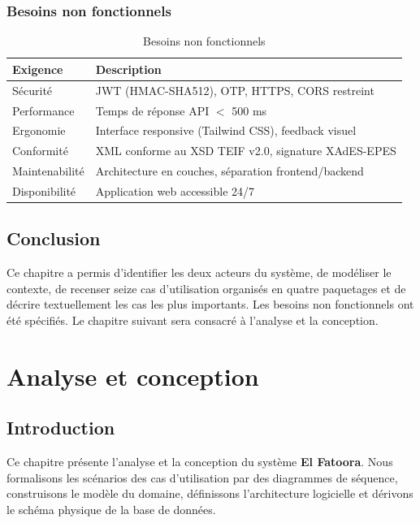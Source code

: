 \documentclass[a4paper,12pt]{report}
\newcommand{\elfattoora}{\textbf{El Fatoora}}
\begin{document}
\subsection*{Besoins non fonctionnels}

\begin{table}[htbp]
\centering
\caption{Besoins non fonctionnels}
\label{tab:bnf}
\begin{tabularx}{\textwidth}{|l|X|}
\hline
\textbf{Exigence} & \textbf{Description} \\
\hline
Sécurité & JWT (HMAC-SHA512), OTP, HTTPS, CORS restreint \\
\hline
Performance & Temps de réponse API $<$ 500 ms \\
\hline
Ergonomie & Interface responsive (Tailwind CSS), feedback visuel \\
\hline
Conformité & XML conforme au XSD TEIF v2.0, signature XAdES-EPES \\
\hline
Maintenabilité & Architecture en couches, séparation frontend/backend \\
\hline
Disponibilité & Application web accessible 24/7 \\
\hline
\end{tabularx}
\end{table}

\section{Conclusion}

Ce chapitre a permis d'identifier les deux acteurs du système, de modéliser le contexte, de recenser seize cas d'utilisation organisés en quatre paquetages et de décrire textuellement les cas les plus importants. Les besoins non fonctionnels ont été spécifiés. Le chapitre suivant sera consacré à l'analyse et la conception.


\chapter{Analyse et conception}

\section{Introduction}

Ce chapitre présente l'analyse et la conception du système \elfattoora{}. Nous formalisons les scénarios des cas d'utilisation par des diagrammes de séquence, construisons le modèle du domaine, définissons l'architecture logicielle et dérivons le schéma physique de la base de données.
\end{document}
